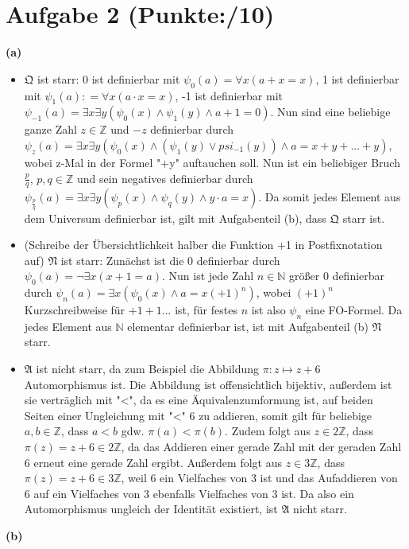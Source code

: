 \documentclass[11pt, a4paper]{article}
\newcommand{\p}{10}
\newcommand{\defgr}{\mathrel{\mathop:\!\!=}}
\newcommand{\struc}[1]{\ensuremath{\mathfrak{#1}}}
\begin{document}
\section*{Aufgabe 2 (Punkte:\qquad/\p)}
\textbf{(a)}
\begin{itemize}
\item \struc{Q} ist starr: 0 ist definierbar mit $\psi_0(a)=\forall x(a + x = x)$, 1 ist definierbar mit $\psi_1(a) \defgr \forall x(a \cdot x = x)$, -1 ist definierbar mit 
	$\psi_{-1}(a)=\exists x \exists y(\psi_0(x) \wedge \psi_1(y) \wedge a+1=0)$. Nun sind eine beliebige ganze Zahl $z \in \mathbb{Z}$ und $-z$ definierbar durch 
	$\psi_z(a)= \exists x \exists y(\psi_0(x) \wedge (\psi_1(y) \vee psi_{-1}(y)) \wedge a = x+y+...+y)$, wobei z-Mal in der Formel "+y" auftauchen soll. Nun ist ein beliebiger Bruch 
	$\frac{p}{q}$, $p,q \in \mathbb{Z}$ und sein negatives definierbar durch $\psi_{\frac{p}{q}}(a)=\exists x \exists y(\psi_p(x) \wedge \psi_q(y) \wedge y \cdot a = x)$. Da somit
	jedes Element aus dem Universum definierbar ist, gilt mit Aufgabenteil (b), dass \struc{Q} starr ist. 
\item (Schreibe der Übersichtlichkeit halber die Funktion +1 in Postfixnotation auf) \struc{N} ist starr: Zunächst ist die 0 definierbar durch $\psi_0(a)=\neg\exists x(x+1=a)$. Nun ist jede Zahl
	$n \in \mathbb{N}$ größer 0 definierbar durch $\psi_n(a)=\exists x(\psi_0(x) \wedge a=x(+1)^n)$, wobei $(+1)^n$ Kurzschreibweise für $+1+1...$ ist, für festes $n$ ist also $\psi_n$
	eine FO-Formel. Da jedes Element aus $\mathbb{N}$ elementar definierbar ist, ist mit Aufgabenteil (b) \struc{N} starr.
\item \struc{A} ist nicht starr, da zum Beispiel die Abbildung $\pi:z \mapsto z+6$ Automorphismus ist. Die Abbildung ist offensichtlich bijektiv, außerdem ist sie verträglich mit "<", da es
	eine Äquivalenzumformung ist, auf beiden Seiten einer Ungleichung mit "<" 6 zu addieren, somit gilt für beliebige $a,b \in \mathbb{Z}$, dass $a<b$ gdw. $\pi(a)<\pi(b)$. Zudem
	folgt aus $z \in 2\mathbb{Z}$, dass $\pi(z)=z+6 \in 2\mathbb{Z}$, da das Addieren einer gerade Zahl mit der geraden Zahl 6 erneut eine gerade Zahl ergibt. Außerdem 
	folgt aus $z \in 3\mathbb{Z}$, dass $\pi(z)=z+6 \in 3\mathbb{Z}$, weil 6 ein Vielfaches von 3 ist und das Aufaddieren von 6 auf ein Vielfaches von 3 ebenfalls Vielfaches von 3 ist.
	Da also ein Automorphismus ungleich der Identität existiert, ist \struc{A} nicht starr.
\end{itemize}
\textbf{(b)}
\end{document}
